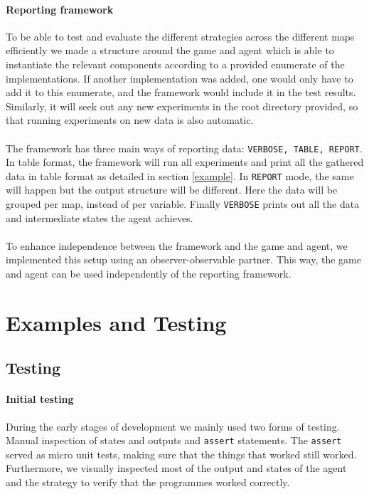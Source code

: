 \documentclass[british]{article}
\newcommand{\code}[1]{\texttt{#1}}
\begin{document}
\paragraph{Reporting framework} To be able to test and evaluate the different strategies across the different maps efficiently we made a structure around the game and agent which is able to instantiate the relevant components according to a provided enumerate of the implementations. If another implementation was added, one would only have to add it to this enumerate, and the framework would include it in the test results. Similarly, it will seek out any new experiments in the root directory provided, so that running experiments on new data is also automatic.
\paragraph{} The framework has three main ways of reporting data: \code{VERBOSE, TABLE, REPORT}. In table format, the framework will run all experiments and print all the gathered data in table format as detailed in section \ref{example}. In \code{REPORT} mode, the same will happen but the output structure will be different. Here the data will be grouped per map, instead of per variable. Finally \code{VERBOSE} prints out all the data and intermediate states the agent achieves.
\paragraph{} To enhance independence between the framework and the game and agent, we implemented this setup using an observer-observable partner. This way, the game and agent can be used independently of the reporting framework.
\section{Examples and Testing}
\label{sec:testing}
\subsection{Testing}
\label{subsec:testing}
\paragraph{Initial testing} During the early stages of development we mainly used two forms of testing. Manual inspection of states and outputs and \code{assert} statements. The \code{assert} served as micro unit tests, making sure that the things that worked still worked. Furthermore, we visually inspected most of the output and states of the agent and the strategy to verify that the programmes worked correctly.
\end{document}
